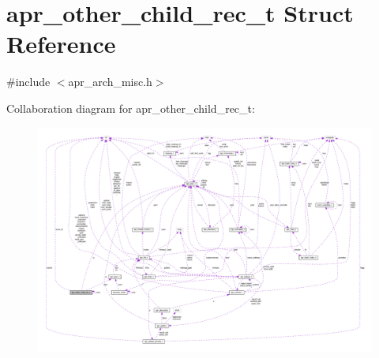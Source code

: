 \hypertarget{structapr__other__child__rec__t}{}\section{apr\+\_\+other\+\_\+child\+\_\+rec\+\_\+t Struct Reference}
\label{structapr__other__child__rec__t}


{\ttfamily \#include $<$apr\+\_\+arch\+\_\+misc.\+h$>$}



Collaboration diagram for apr\+\_\+other\+\_\+child\+\_\+rec\+\_\+t\+:
\nopagebreak
\begin{figure}[H]
\begin{center}
\leavevmode
\includegraphics[width=350pt]{structapr__other__child__rec__t__coll__graph}
\end{center}
\end{figure}
